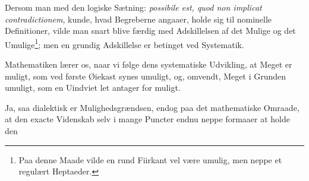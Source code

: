 \documentclass[12pt]{book}
\newcommand{\opage}[1]{\marginnote{\footnotesize\textit{[#1]}}}
\begin{document}
Dersom man med den logiske Sætning: \textit{possibile est, quod non implicat
contradictionem}, kunde, hvad Begreberne angaaer, holde sig til nominelle
Definitioner, vilde man snart blive færdig med Adskillelsen af det Mulige og det
Umulige\footnote{Paa denne Maade vilde en rund Fiirkant vel være umulig, men
neppe et regulært Heptaeder.}; men en grundig Adskillelse er betinget ved
Systematik.

Mathematiken lærer os, naar vi følge dens systematiske Udvikling, at Meget er
muligt, som ved første Øiekast synes umuligt, og, omvendt, Meget i Grunden
umuligt, som en Uindviet let antager for muligt.

\opage{39} Ja, saa dialektisk er Mulighedsgrændsen, endog paa det mathematiske Omraade, at
den exacte Videnskab selv i mange Puncter endnu neppe formaaer at holde den
\end{document}
